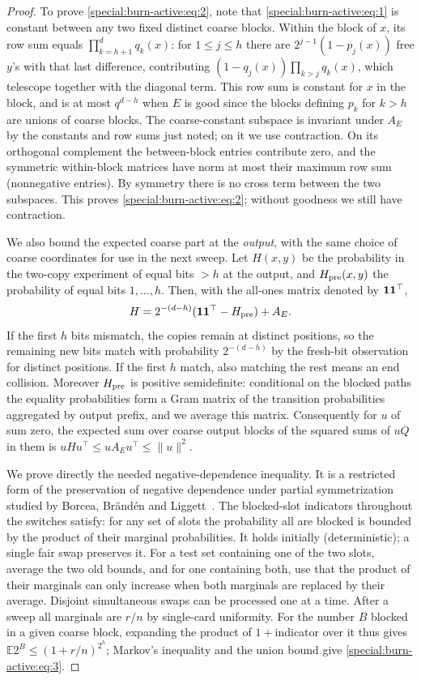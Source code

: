 \begin{proof}
To prove \eqref{special:burn-active:eq:2}, note that \eqref{special:burn-active:eq:1} is constant between any two fixed distinct coarse blocks. Within the block of \(x\), its row sum equals \(\prod_{k=h+1}^d q_k(x)\): for \(1\le j\le h\) there are \(2^{j-1}(1-p_j(x))\) free \(y\)'s with that last difference, contributing \((1-q_j(x))\prod_{k>j}q_k(x)\), which telescope together with the diagonal term. This row sum is constant for \(x\) in the block, and is at most \(q^{d-h}\) when \(E\) is good since the blocks defining \(p_k\) for \(k>h\) are unions of coarse blocks. The coarse-constant subspace is invariant under \(A_E\) by the constants and row sums just noted; on it we use contraction. On its orthogonal complement the between-block entries contribute zero, and the symmetric within-block matrices have norm at most their maximum row sum (nonnegative entries). By symmetry there is no cross term between the two subspaces. This proves \eqref{special:burn-active:eq:2}; without goodness we still have contraction.

We also bound the expected coarse part at the \emph{output}, with the same choice of coarse coordinates for use in the next sweep. Let \(H(x,y)\) be the probability in the two-copy experiment of equal bits \(>h\) at the output, and \(H_{\rm pre}(x,y)\) the probability of equal bits \(1,\ldots,h\). Then, with the all-ones matrix denoted by \({\bf 1}{\bf 1}^\top\),
\[
 H=2^{-(d-h)}({\bf 1}{\bf 1}^\top-H_{\rm pre})+A_E .
\]
If the first \(h\) bits mismatch, the copies remain at distinct positions, so the remaining new bits match with probability \(2^{-(d-h)}\) by the fresh-bit observation for distinct positions. If the first \(h\) match, also matching the rest means an end collision. Moreover \(H_{\rm pre}\) is positive semidefinite: conditional on the blocked paths the equality probabilities form a Gram matrix of the transition probabilities aggregated by output prefix, and we average this matrix. Consequently for \(u\) of sum zero, the expected sum over coarse output blocks of the squared sums of \(uQ\) in them is \(u H u^\top\le u A_E u^\top\le\|u\|^2\).

We prove directly the needed negative-dependence inequality. It is a restricted form of the preservation of negative dependence under partial symmetrization studied by Borcea, Br\"and\'en and Liggett~\cite[Theorems~4.9 and~4.20]{bbl2009}. The blocked-slot indicators throughout the switches satisfy: for any set of slots the probability all are blocked is bounded by the product of their marginal probabilities. It holds initially (deterministic); a single fair swap preserves it. For a test set containing one of the two slots, average the two old bounds, and for one containing both, use that the product of their marginals can only increase when both marginals are replaced by their average. Disjoint simultaneous swaps can be processed one at a time. After a sweep all marginals are \(r/n\) by single-card uniformity. For the number \(B\) blocked in a given coarse block, expanding the product of \(1+\)indicator over it thus gives \(\mathbb E 2^B\le(1+r/n)^{2^h}\); Markov's inequality and the union bound give \eqref{special:burn-active:eq:3}.


\end{proof}
